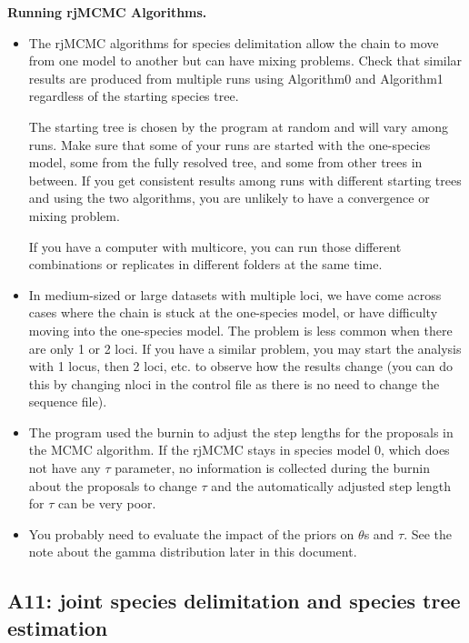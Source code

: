\documentclass[a4paper]{book}
\numberwithin{equation}{section} \renewcommand{\baselinestretch}{0.55}
\begin{document}
\begin{mdframed}
  \textbf{Running rjMCMC Algorithms.}
  \begin{itemize}
  \item The rjMCMC algorithms for species delimitation allow the chain
    to move from one model to another but can have mixing problems.
    Check that similar results are produced from multiple runs using
    Algorithm0 and Algorithm1 regardless of the starting species tree.

    The starting tree is chosen by the program at random and will vary
    among runs.  Make sure that some of your runs are started with the
    one-species model, some from the fully resolved tree, and some
    from other trees in between.  If you get consistent results among
    runs with different starting trees and using the two algorithms,
    you are unlikely to have a convergence or mixing problem.

    If you have a computer with multicore, you can run those different
    combinations or replicates in different folders at the same time.

  \item In medium-sized or large datasets with multiple loci, we have
    come across cases where the chain is stuck at the one-species
    model, or have difficulty moving into the one-species model.  The
    problem is less common when there are only 1 or 2 loci.  If you
    have a similar problem, you may start the analysis with 1 locus,
    then 2 loci, etc. to observe how the results change (you can do
    this by changing nloci in the control file as there is no need to
    change the sequence file).

  \item The program used the burnin to adjust the step lengths for the
    proposals in the MCMC algorithm.  If the rjMCMC stays in species
    model 0, which does not have any $\tau$ parameter, no information
    is collected during the burnin about the proposals to change
    $\tau$ and the automatically adjusted step length for $\tau$ can
    be very poor.

  \item You probably need to evaluate the impact of the priors on
    $\theta$s and $\tau$.  See the note about the gamma distribution
    later in this document.
  \end{itemize}
\end{mdframed}

\subsection{A11: joint species delimitation and species tree
  estimation}
\end{document}

